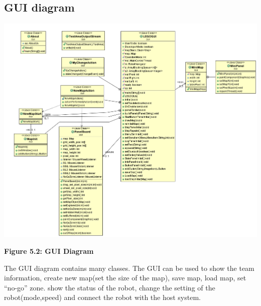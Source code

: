 \documentclass[11pt, a4paper]{report}
\begin{document}
\subsection{GUI diagram}
 \begin{center}
 \includegraphics[width=18.20cm]{GUI.png}
\end{center}
\begin{center}
\textbf {Figure 5.2: GUI Diagram} \\[0.3cm]
\end{center}
The GUI diagram contains many classes. The GUI can be used to show the team information, create new map(set the size of the map), save map, load map, set ``no-go'' zone. show the status of the robot, change the setting of the robot(mode,speed) and connect the robot with the host system. 
\pagebreak
\end{document}

